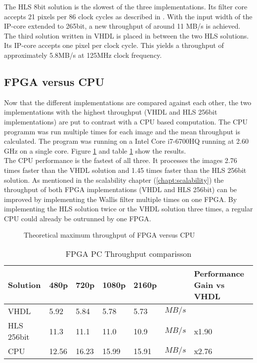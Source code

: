 The HLS 8bit solution is the slowest of the three implementations. Its filter
core accepts 21 pixels per 86 clock cycles as described in . With the input width of the IP-core extended to 265bit,
a new throughput of around 11 MB/s is achieved. The third solution written
in VHDL is placed in between the two HLS solutions. Its IP-core accepts one
pixel per clock cycle. This yields a throughput of approximately 5.8MB/s at
125MHz clock frequency.

\clearpage
\subsection{FPGA versus CPU}
Now that the different implementations are compared against each other, the
two implementations with the highest throughput (VHDL and HLS 256bit
implementations) are put to contrast with a CPU based computation.  The CPU
programm was run multiple times for each image and the mean throughput is
calculated. The program was running on a Intel Core i7-6700HQ running at 2.60
GHz on a single core.  Figure \ref{fig:theoreticalmax} and table
\ref{tab:throughputcompare} show the results.
\\

The CPU performance is the fastest of all three. It processes the images 2.76
times faster than the VHDL solution and 1.45 times faster than the HLS 256bit
solution. As mentioned in the scalability chapter (\ref{chapt:scalability}) the
throughput of both FPGA implementations (VHDL and HLS 256bit) can be improved by
implementing the Wallis filter multiple times on one FPGA. By implementing the
HLS solution twice or the VHDL solution three times, a regular CPU could already
be outrunned by one FPGA.

\begin{figure}[b!]
    \centering
    \begin{adjustbox}{max width=\linewidth}
        
    \end{adjustbox}
    \caption{Theoretical maximum throughput of FPGA versus CPU}
    \label{fig:theoreticalmax}
\end{figure}

\begin{table}[b!]
    \centering
    \begin{tabular}{l l l l l l l}
        \toprule
        Solution & 480p & 720p & 1080p & 2160p & & Performance Gain vs VHDL\\
        \midrule
        VHDL       & 5.92  & 5.84  & 5.78  & 5.73  & $MB/s$ & \\
        HLS 256bit & 11.3  & 11.1  & 11.0  & 10.9  & $MB/s$ & x1.90\\
        CPU        & 12.56 & 16.23 & 15.99 & 15.91 & $MB/s$ & x2.76\\
        \bottomrule
    \end{tabular}
    \caption{FPGA PC Throughput comparisson}
    \label{tab:throughputcompare}
\end{table}

